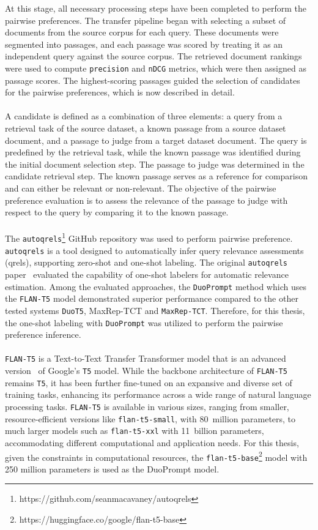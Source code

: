 At this stage, all necessary processing steps have been completed to perform the pairwise preferences. The transfer pipeline began with selecting a subset of documents from the source corpus for each query. These documents were segmented into passages, and each passage was scored by treating it as an independent query against the source corpus. The retrieved document rankings were used to compute \texttt{precision} and \texttt{nDCG} metrics, which were then assigned as passage scores. The highest-scoring passages guided the selection of candidates for the pairwise preferences, which is now described in detail.
\\\\
A candidate is defined as a combination of three elements: a query from a retrieval task of the source dataset, a known passage from a source dataset document, and a passage to judge from a target dataset document. The query is predefined by the retrieval task, while the known passage was identified during the initial document selection step. The passage to judge was determined in the candidate retrieval step. The known passage serves as a reference for comparison and can either be relevant or non-relevant. The objective of the pairwise preference evaluation is to assess the relevance of the passage to judge with respect to the query by comparing it to the known passage.
\\\\
The \texttt{autoqrels}\footnote{https://github.com/seanmacavaney/autoqrels} GitHub repository was used to perform pairwise preference. \texttt{autoqrels} is a tool designed to automatically infer query relevance assessments (qrels), supporting zero-shot and one-shot labeling. The original \texttt{autoqrels} paper~\citep{macavaney:2023} evaluated the capability of one-shot labelers for automatic relevance estimation. Among the evaluated approaches, the \texttt{DuoPrompt} method which uses the \texttt{FLAN-T5} model demonstrated superior performance compared to the other tested systems \texttt{DuoT5}, {MaxRep-TCT} and \texttt{MaxRep-TCT}. Therefore, for this thesis, the one-shot labeling with \texttt{DuoPrompt} was utilized to perform the pairwise preference inference.
\\\\
\texttt{FLAN-T5} is a Text-to-Text Transfer Transformer model that is an advanced version~\citep{chung:2022} of Google's \texttt{T5} model. While the backbone architecture of \texttt{FLAN-T5} remains \texttt{T5}, it has been further fine-tuned on an expansive and diverse set of training tasks, enhancing its performance across a wide range of natural language processing tasks. \texttt{FLAN-T5} is available in various sizes, ranging from smaller, resource-efficient versions like \texttt{flan-t5-small}, with 80~million parameters, to much larger models such as \texttt{flan-t5-xxl} with 11~billion parameters, accommodating different computational and application needs. For this thesis, given the constraints in computational resources, the \texttt{flan-t5-base}\footnote{https://huggingface.co/google/flan-t5-base} model with 250 million parameters is used as the DuoPrompt model.
